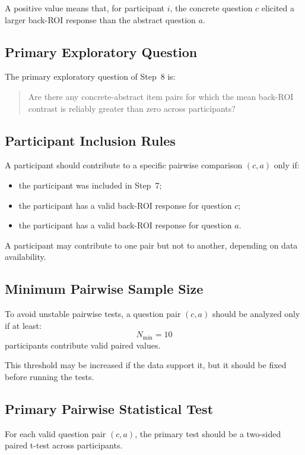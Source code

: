 A positive value means that, for participant \(i\), the concrete question \(c\)
elicited a larger back-ROI response than the abstract question \(a\).

\subsection{Primary Exploratory Question}
The primary exploratory question of Step~8 is:
\begin{quote}
Are there any concrete-abstract item pairs for which the mean back-ROI contrast
is reliably greater than zero across participants?
\end{quote}

\subsection{Participant Inclusion Rules}
A participant should contribute to a specific pairwise comparison \((c,a)\) only if:
\begin{itemize}
    \item the participant was included in Step~7;
    \item the participant has a valid back-ROI response for question \(c\);
    \item the participant has a valid back-ROI response for question \(a\).
\end{itemize}

A participant may contribute to one pair but not to another, depending on data availability.

\subsection{Minimum Pairwise Sample Size}
To avoid unstable pairwise tests, a question pair \((c,a)\) should be analyzed only if at least:
\begin{equation}
N_{\min} = 10
\end{equation}
participants contribute valid paired values.

This threshold may be increased if the data support it, but it should be fixed before running the tests.

\subsection{Primary Pairwise Statistical Test}
For each valid question pair \((c,a)\), the primary test should be a two-sided paired t-test across participants.

